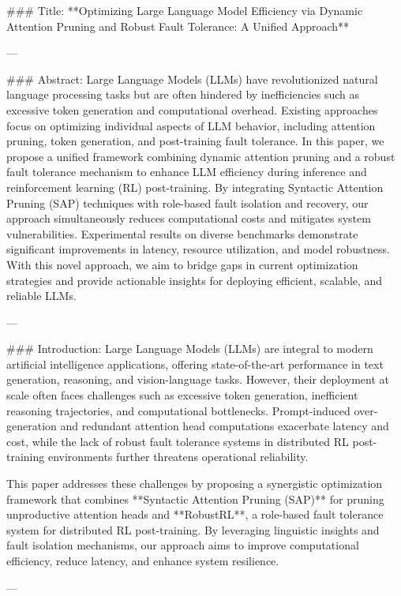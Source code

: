 ### Title:
**Optimizing Large Language Model Efficiency via Dynamic Attention Pruning and Robust Fault Tolerance: A Unified Approach**

---

### Abstract:
Large Language Models (LLMs) have revolutionized natural language processing tasks but are often hindered by inefficiencies such as excessive token generation and computational overhead. Existing approaches focus on optimizing individual aspects of LLM behavior, including attention pruning, token generation, and post-training fault tolerance. In this paper, we propose a unified framework combining dynamic attention pruning and a robust fault tolerance mechanism to enhance LLM efficiency during inference and reinforcement learning (RL) post-training. By integrating Syntactic Attention Pruning (SAP) techniques with role-based fault isolation and recovery, our approach simultaneously reduces computational costs and mitigates system vulnerabilities. Experimental results on diverse benchmarks demonstrate significant improvements in latency, resource utilization, and model robustness. With this novel approach, we aim to bridge gaps in current optimization strategies and provide actionable insights for deploying efficient, scalable, and reliable LLMs.

---

### Introduction:
Large Language Models (LLMs) are integral to modern artificial intelligence applications, offering state-of-the-art performance in text generation, reasoning, and vision-language tasks. However, their deployment at scale often faces challenges such as excessive token generation, inefficient reasoning trajectories, and computational bottlenecks. Prompt-induced over-generation and redundant attention head computations exacerbate latency and cost, while the lack of robust fault tolerance systems in distributed RL post-training environments further threatens operational reliability.

This paper addresses these challenges by proposing a synergistic optimization framework that combines **Syntactic Attention Pruning (SAP)** for pruning unproductive attention heads and **RobustRL**, a role-based fault tolerance system for distributed RL post-training. By leveraging linguistic insights and fault isolation mechanisms, our approach aims to improve computational efficiency, reduce latency, and enhance system resilience.

---

